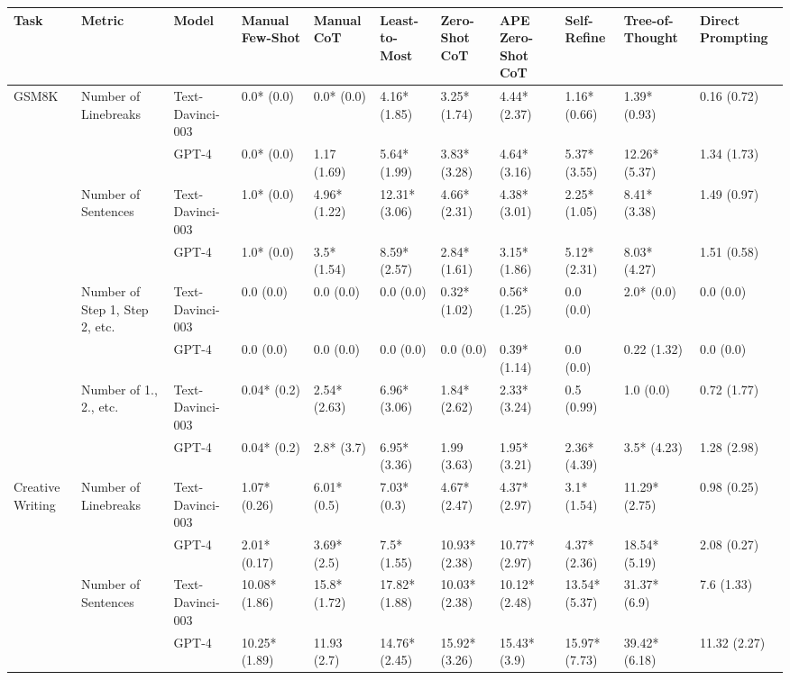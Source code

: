 \begin{tabular}{x{0.75cm}|x{1.5cm}|x{0.75cm}|x{0.75cm}|x{0.75cm}|x{0.75cm}|x{0.75cm}|x{0.75cm}|x{0.75cm}|x{0.75cm}|x{0.75cm}}
\toprule
\hline
Task & Metric & Model & Manual Few-Shot & Manual CoT & Least-to-Most & Zero-Shot CoT & APE Zero-Shot CoT & Self-Refine & Tree-of-Thought & Direct Prompting \\
\hline
\midrule
GSM8K & Number of Linebreaks & Text-Davinci-003 & 0.0* (0.0) & 0.0* (0.0) & 4.16* (1.85) & 3.25* (1.74) & 4.44* (2.37) & 1.16* (0.66) & 1.39* (0.93) & 0.16 (0.72) \\
\hline
 &  & GPT-4 & 0.0* (0.0) & 1.17 (1.69) & 5.64* (1.99) & 3.83* (3.28) & 4.64* (3.16) & 5.37* (3.55) & 12.26* (5.37) & 1.34 (1.73) \\
\hline
 & Number of Sentences & Text-Davinci-003 & 1.0* (0.0) & 4.96* (1.22) & 12.31* (3.06) & 4.66* (2.31) & 4.38* (3.01) & 2.25* (1.05) & 8.41* (3.38) & 1.49 (0.97) \\
\hline
 &  & GPT-4 & 1.0* (0.0) & 3.5* (1.54) & 8.59* (2.57) & 2.84* (1.61) & 3.15* (1.86) & 5.12* (2.31) & 8.03* (4.27) & 1.51 (0.58) \\
\hline
 & Number of Step 1, Step 2, etc. & Text-Davinci-003 & 0.0 (0.0) & 0.0 (0.0) & 0.0 (0.0) & 0.32* (1.02) & 0.56* (1.25) & 0.0 (0.0) & 2.0* (0.0) & 0.0 (0.0) \\
\hline
 &  & GPT-4 & 0.0 (0.0) & 0.0 (0.0) & 0.0 (0.0) & 0.0 (0.0) & 0.39* (1.14) & 0.0 (0.0) & 0.22 (1.32) & 0.0 (0.0) \\
\hline
 & Number of 1., 2., etc. & Text-Davinci-003 & 0.04* (0.2) & 2.54* (2.63) & 6.96* (3.06) & 1.84* (2.62) & 2.33* (3.24) & 0.5 (0.99) & 1.0 (0.0) & 0.72 (1.77) \\
\hline
 &  & GPT-4 & 0.04* (0.2) & 2.8* (3.7) & 6.95* (3.36) & 1.99 (3.63) & 1.95* (3.21) & 2.36* (4.39) & 3.5* (4.23) & 1.28 (2.98) \\
\hline
Creative Writing & Number of Linebreaks & Text-Davinci-003 & 1.07* (0.26) & 6.01* (0.5) & 7.03* (0.3) & 4.67* (2.47) & 4.37* (2.97) & 3.1* (1.54) & 11.29* (2.75) & 0.98 (0.25) \\
\hline
 &  & GPT-4 & 2.01* (0.17) & 3.69* (2.5) & 7.5* (1.55) & 10.93* (2.38) & 10.77* (2.97) & 4.37* (2.36) & 18.54* (5.19) & 2.08 (0.27) \\
\hline
 & Number of Sentences & Text-Davinci-003 & 10.08* (1.86) & 15.8* (1.72) & 17.82* (1.88) & 10.03* (2.38) & 10.12* (2.48) & 13.54* (5.37) & 31.37* (6.9) & 7.6 (1.33) \\
\hline
 &  & GPT-4 & 10.25* (1.89) & 11.93 (2.7) & 14.76* (2.45) & 15.92* (3.26) & 15.43* (3.9) & 15.97* (7.73) & 39.42* (6.18) & 11.32 (2.27) \\

\end{tabular}
